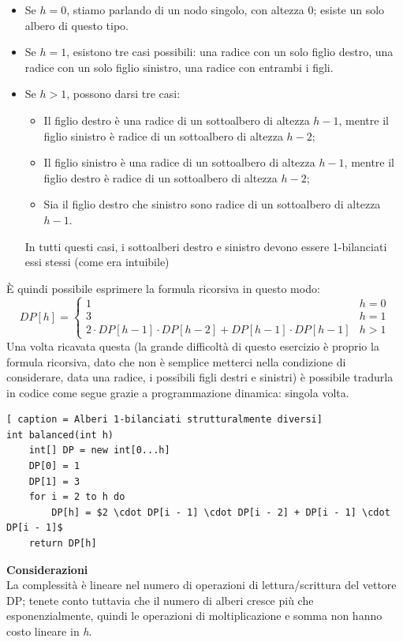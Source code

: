 \documentclass[../cheatSheetAlgoritmi.tex]{subfiles}
\begin{document}
\begin{itemize}
	\item Se $h = 0$, stiamo parlando di un nodo singolo, con altezza 0; esiste un solo albero di questo tipo.
	\item Se $h = 1$, esistono tre casi possibili: una radice con un solo figlio destro, una radice con un solo figlio sinistro, una radice con entrambi i figli.
	\item Se $h > 1$, possono darsi tre casi: 
		\begin{itemize}
			\item Il figlio destro è una radice di un sottoalbero di altezza $h - 1$, mentre il figlio sinistro è radice di un sottoalbero di altezza $h - 2$;
			\item Il figlio sinistro è una radice di un sottoalbero di altezza $h - 1$, mentre il figlio destro è radice di un sottoalbero di altezza $h - 2$;
			\item Sia il figlio destro che sinistro sono radice di un sottoalbero di altezza $h - 1$.
		\end{itemize}
		In tutti questi casi, i sottoalberi destro e sinistro devono essere 1-bilanciati essi stessi (come era intuibile)
\end{itemize}
È quindi possibile esprimere la formula ricorsiva in questo modo: 
\begin{equation*}
  	DP[h] =\begin{cases}
    	1 & \text{$h = 0$}\\
    	3 & \text{$h = 1$}\\
    	2 \cdot DP[h - 1] \cdot DP[h - 2]  + DP[h - 1] \cdot DP[h - 1] & \text{$h > 1$}
  	\end{cases}
\end{equation*}
Una volta ricavata questa (la grande difficoltà di questo esercizio è proprio la formula ricorsiva, dato che non è semplice metterci nella condizione di considerare, data una radice, i possibili figli destri e sinistri) è possibile tradurla in codice come segue grazie a programmazione dinamica:
singola volta.
\begin{lstlisting}[ caption = Alberi 1-bilanciati strutturalmente diversi]
int balanced(int h)
	int[] DP = new int[0...h]
	DP[0] = 1
	DP[1] = 3
	for i = 2 to h do
		DP[h] = $2 \cdot DP[i - 1] \cdot DP[i - 2] + DP[i - 1] \cdot DP[i - 1]$
	return DP[h]
\end{lstlisting}
\textbf{Considerazioni} \\
La complessità è lineare nel numero di operazioni di lettura/scrittura del vettore DP; tenete conto tuttavia che il numero di alberi cresce più che esponenzialmente, quindi le operazioni di moltiplicazione e somma non hanno costo lineare in \emph{h}.
\newpage
\end{document}
